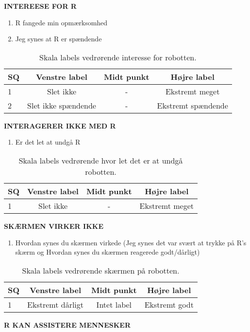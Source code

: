\noindent
%
\textbf{INTEREESE FOR R}\\
%
\begin{enumerate}
  \item R fangede min opmærksomhed
  \item Jeg synes at R er spændende
\end{enumerate}
%
\begin{table}[H]
	\centering 
	\begin{tabular}{l|c|c|c}
		SQ     & Venstre label & Midt punkt & Højre label \\\hline
		1   & Slet ikke & - & Ekstremt meget          \\\hline
		2   & Slet ikke spændende & - & Ekstremt spændende                 
	\end{tabular}
\caption{Skala labels vedrørende interesse for robotten.}
	\label{tab:InteresseForR}
\end{table}
\noindent
%
\textbf{INTERAGERER IKKE MED R}\\
%
\begin{enumerate}
  \item Er det let at undgå R
\end{enumerate} 
%
\begin{table}[H]
	\centering
	\begin{tabular}{l|c|c|c}
		SQ     & Venstre label & Midt punkt & Højre label \\\hline
		1   & Slet ikke & - & Ekstremt meget                 
	\end{tabular}
\caption{Skala labels vedrørende hvor let det er at undgå robotten.}
	\label{tab:IgnorerR} 
\end{table}
\noindent
%
\textbf{SKÆRMEN VIRKER IKKE}\\
%
\begin{enumerate}
  \item Hvordan synes du skærmen virkede (Jeg synes det var svært at trykke på R's skærm og Hvordan synes du skærmen reagerede godt/dårligt)
\end{enumerate}
%
\begin{table}[H]
	\centering 
	\begin{tabular}{l|c|c|c}
		SQ     & Venstre label & Midt punkt & Højre label \\\hline
		1   & Ekstremt dårligt & Intet label & Ekstremt godt                 
	\end{tabular}
\caption{Skala labels vedrørende skærmen på robotten.}
	\label{tab:SkaermenR}
\end{table}
\noindent
%
\textbf{R KAN ASSISTERE MENNESKER}\\
